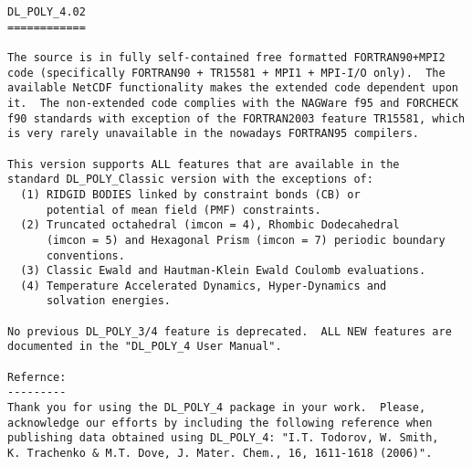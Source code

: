 \label{readme}
\begin{verbatim}
DL_POLY_4.02
============

The source is in fully self-contained free formatted FORTRAN90+MPI2
code (specifically FORTRAN90 + TR15581 + MPI1 + MPI-I/O only).  The
available NetCDF functionality makes the extended code dependent upon
it.  The non-extended code complies with the NAGWare f95 and FORCHECK
f90 standards with exception of the FORTRAN2003 feature TR15581, which
is very rarely unavailable in the nowadays FORTRAN95 compilers.

This version supports ALL features that are available in the
standard DL_POLY_Classic version with the exceptions of:
  (1) RIDGID BODIES linked by constraint bonds (CB) or
      potential of mean field (PMF) constraints.
  (2) Truncated octahedral (imcon = 4), Rhombic Dodecahedral
      (imcon = 5) and Hexagonal Prism (imcon = 7) periodic boundary
      conventions.
  (3) Classic Ewald and Hautman-Klein Ewald Coulomb evaluations.
  (4) Temperature Accelerated Dynamics, Hyper-Dynamics and
      solvation energies.

No previous DL_POLY_3/4 feature is deprecated.  ALL NEW features are
documented in the "DL_POLY_4 User Manual".

Refernce:
---------
Thank you for using the DL_POLY_4 package in your work.  Please,
acknowledge our efforts by including the following reference when
publishing data obtained using DL_POLY_4: "I.T. Todorov, W. Smith,
K. Trachenko & M.T. Dove, J. Mater. Chem., 16, 1611-1618 (2006)".


\end{verbatim}

